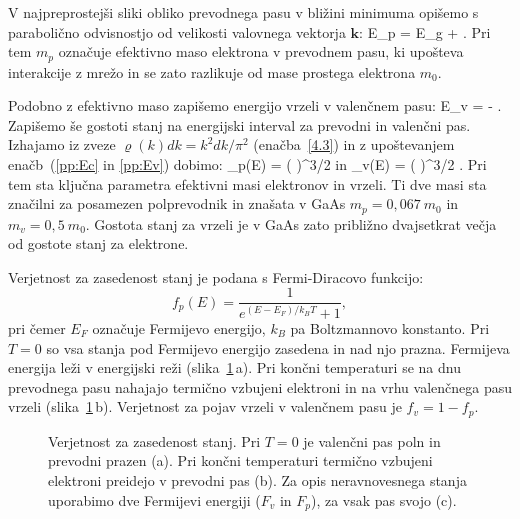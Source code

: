 V najpreprostejši sliki obliko prevodnega pasu v bližini minimuma opišemo 
s parabolično odvisnostjo od velikosti valovnega vektorja $\mathbf{k}$:
\beq
E_p = E_g + .
\label{pp:Ec}
\eeq
Pri tem $m_p$ označuje efektivno maso elektrona v prevodnem pasu, ki upošteva
interakcije z mrežo in se zato razlikuje od mase prostega elektrona $m_0$.

Podobno z efektivno maso zapišemo energijo vrzeli v valenčnem pasu:
\beq
E_v = - .
\label{pp:Ev}
\eeq
Zapišemo še gostoti stanj na energijski interval za prevodni in valenčni pas. Izhajamo iz zveze
$\varrho(k) dk = k^2dk /\pi^2$ (enačba~\ref{4.3}) in z upoštevanjem 
enačb~(\ref{pp:Ec} in \ref{pp:Ev}) dobimo:
\beq
\varrho_p(E) = \left( \right)^{3/2} 
\label{eq:rho_v}
\eeq
in
\beq
\varrho_v(E) = \left( \right)^{3/2} .
\label{eq:rho_p}
\eeq
Pri tem sta ključna parametra efektivni masi 
elektronov in vrzeli. Ti dve masi sta značilni za posamezen polprevodnik
in znašata v GaAs $m_p = 0,067~m_0$ in $m_v = 0,5~m_0$. 
Gostota stanj za vrzeli je v GaAs zato približno 
dvajsetkrat večja od gostote stanj za elektrone.

Verjetnost za zasedenost stanj je podana s Fermi-Diracovo funkcijo: 
\begin{equation}  
f_p(E)=\frac{1}{e^{(E-E_F)/k_B T}+1},
\label{eq:7FD}
\end{equation}
pri čemer $E_F$ označuje Fermijevo energijo, $k_B$ pa Boltzmannovo konstanto. 
Pri $T=0$ so vsa stanja pod 
Fermijevo energijo zasedena in nad njo prazna. Fermijeva energija leži
v energijski reži (slika~\ref{fig:Fermi}\,a). Pri končni temperaturi se na dnu prevodnega pasu nahajajo 
termično vzbujeni elektroni in na vrhu valenčnega pasu vrzeli (slika~\ref{fig:Fermi}\,b). Verjetnost 
za pojav vrzeli v valenčnem pasu je $f_v = 1 - f_p$.

\begin{figure}[ht]
\centering
\def\svgwidth{128truemm} 

\caption{Verjetnost za zasedenost stanj. Pri $T=0$ je valenčni pas poln in prevodni prazen (a).
Pri končni temperaturi termično vzbujeni elektroni preidejo v prevodni pas (b). Za opis neravnovesnega
stanja uporabimo dve Fermijevi energiji ($F_v$ in $F_p$), za vsak pas svojo (c).
}
\label{fig:Fermi}
\end{figure}

